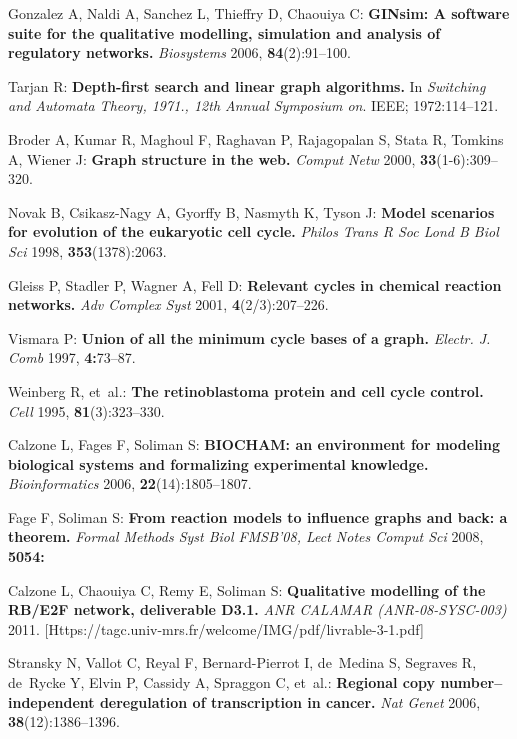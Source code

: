 \documentclass[11pt]{bmc_article_s50}
\begin{document}
\begin{thebibliography}{10}
Gonzalez A, Naldi A, Sanchez L, Thieffry D, Chaouiya C: \textbf{GINsim: A
  software suite for the qualitative modelling, simulation and analysis of
  regulatory networks.} \emph{Biosystems} 2006, \textbf{84}(2):91--100.

Tarjan R: \textbf{Depth-first search and linear graph algorithms.} In
  \emph{Switching and Automata Theory, 1971., 12th Annual Symposium on}. IEEE;
  1972:114--121.

Broder A, Kumar R, Maghoul F, Raghavan P, Rajagopalan S, Stata R, Tomkins A,
  Wiener J: \textbf{Graph structure in the web.} \emph{Comput Netw} 2000,
  \textbf{33}(1-6):309--320.

Novak B, Csikasz-Nagy A, Gyorffy B, Nasmyth K, Tyson J: \textbf{Model scenarios
  for evolution of the eukaryotic cell cycle.} \emph{Philos Trans R Soc Lond B Biol Sci} 1998,
  \textbf{353}(1378):2063.

Gleiss P, Stadler P, Wagner A, Fell D: \textbf{Relevant cycles in chemical
  reaction networks.} \emph{Adv Complex Syst} 2001,
  \textbf{4}(2/3):207--226.

Vismara P: \textbf{Union of all the minimum cycle bases of a graph.}
  \emph{Electr. J. Comb} 1997, \textbf{4:}73--87.

Weinberg R, et~al.: \textbf{The retinoblastoma protein and cell cycle control.}
  \emph{Cell} 1995, \textbf{81}(3):323--330.

Calzone L, Fages F, Soliman S: \textbf{BIOCHAM: an environment for modeling
  biological systems and formalizing experimental knowledge.}
  \emph{Bioinformatics} 2006, \textbf{22}(14):1805--1807.

Fage F, Soliman S: \textbf{From reaction models to influence graphs and back: a
  theorem.} \emph{Formal Methods Syst Biol FMSB'08, Lect Notes
  Comput Sci} 2008, \textbf{5054:}

Calzone L, Chaouiya C, Remy E, Soliman S: \textbf{Qualitative modelling of the
  RB/E2F network, deliverable D3.1.} \emph{ANR CALAMAR (ANR-08-SYSC-003)} 2011.
  [Https://tagc.univ-mrs.fr/welcome/IMG/pdf/livrable-3-1.pdf]

Stransky N, Vallot C, Reyal F, Bernard-Pierrot I, de~Medina S, Segraves R,
  de~Rycke Y, Elvin P, Cassidy A, Spraggon C, et~al.: \textbf{Regional copy
  number--independent deregulation of transcription in cancer.} \emph{Nat
  Genet} 2006, \textbf{38}(12):1386--1396.

\end{thebibliography}
\end{document}
